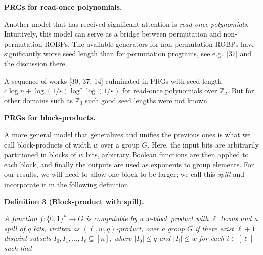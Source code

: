 \documentclass[10pt,a4paper]{article}
\begin{document}
\par\medskip\noindent\textbf{PRGs for read-once polynomials.}\par




Another model that has received significant attention is \emph{read-once
polynomials}. Intuitively, this model can serve as a bridge between
permutation and non-permutation ROBPs. The available generators for
non-permutation ROBPs have significantly worse seed length than for
permutation programs, see e.g. [37] and the discussion
there.\par




A sequence of works [30, 37, 14]
culminated in PRGs with seed length $c\log n+\log(1/\varepsilon)\log^{c}\log(1/\varepsilon)$
for read-once polynomials over $\mathbb{Z}_{2}$. But for other domains
such as $\mathbb{Z}_{3}$ such good seed lengths were not known.\par





\par\medskip\noindent\textbf{PRGs for block-products.}\par




A more general model that generalizes and unifies the previous ones
is what we call block-products of width $w$ over a group $G$. Here,
the input bits are arbitrarily partitioned in blocks of $w$ bits,
arbitrary Boolean functions are then applied to each
block, and finally the outputs are used as exponents to group elements. For our results, we will need to allow one block to be
larger; we call this \emph{spill} and incorporate it in the following
definition.\par





\par\medskip\noindent\textbf{
\textbf{Definition 3}\textbf{ }(Block-product with spill)\textbf{.}
}\par



\emph{A function $f\colon\{0,1\}^{n}\to G$ is computable by a $w$-block product
with $\ell$ terms and a spill of $q$ bits, written as $(\ell,w,q)$-product,
over a group $G$ if there exist $\ell+1$
disjoint subsets $I_{0},I_{1},\ldots,I_{\ell}\subseteq[n]$, where $\lvert I_{0}\rvert\leq q$ and
$\lvert I_{i}\rvert\leq w$ for each $i\in[\ell]$ such that}\par
\end{document}
